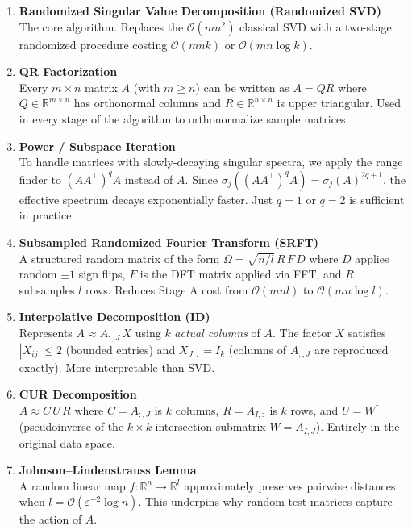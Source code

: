 \documentclass[12pt,a4paper]{article}
\begin{document}
\begin{enumerate}[leftmargin=1.8em, itemsep=4pt]
  \item \textbf{Randomized Singular Value Decomposition (Randomized SVD)}\\
    The core algorithm. Replaces the $\mathcal{O}(mn^2)$ classical SVD with a two-stage
    randomized procedure costing $\mathcal{O}(mnk)$ or $\mathcal{O}(mn\log k)$.

  \item \textbf{QR Factorization}\\
    Every $m \times n$ matrix $A$ (with $m \geq n$) can be written as $A = QR$ where
    $Q \in \mathbb{R}^{m \times n}$ has orthonormal columns and $R \in \mathbb{R}^{n \times n}$
    is upper triangular. Used in every stage of the algorithm to orthonormalize sample matrices.

  \item \textbf{Power / Subspace Iteration}\\
    To handle matrices with slowly-decaying singular spectra, we apply the range finder
    to $(AA^\top)^q A$ instead of $A$. Since $\sigma_j((AA^\top)^q A) = \sigma_j(A)^{2q+1}$,
    the effective spectrum decays exponentially faster. Just $q=1$ or $q=2$ is sufficient in practice.

  \item \textbf{Subsampled Randomized Fourier Transform (SRFT)}\\
    A structured random matrix of the form $\Omega = \sqrt{n/l}\,R\,F\,D$ where $D$ applies
    random $\pm 1$ sign flips, $F$ is the DFT matrix applied via FFT, and $R$ subsamples
    $l$ rows. Reduces Stage A cost from $\mathcal{O}(mnl)$ to $\mathcal{O}(mn\log l)$.

  \item \textbf{Interpolative Decomposition (ID)}\\
    Represents $A \approx A_{:,J}\,X$ using $k$ \emph{actual columns} of $A$. The factor
    $X$ satisfies $|X_{ij}| \leq 2$ (bounded entries) and $X_{J,:} = I_k$ (columns
    of $A_{:,J}$ are reproduced exactly). More interpretable than SVD.

  \item \textbf{CUR Decomposition}\\
    $A \approx C\,U\,R$ where $C = A_{:,J}$ is $k$ columns, $R = A_{I,:}$ is $k$ rows,
    and $U = W^\dagger$ (pseudoinverse of the $k \times k$ intersection submatrix
    $W = A_{I,J}$). Entirely in the original data space.

  \item \textbf{Johnson--Lindenstrauss Lemma}\\
    A random linear map $f: \mathbb{R}^n \to \mathbb{R}^l$ approximately preserves
    pairwise distances when $l = \mathcal{O}(\varepsilon^{-2}\log n)$. This underpins
    why random test matrices capture the action of $A$.


\end{enumerate}
\end{document}
